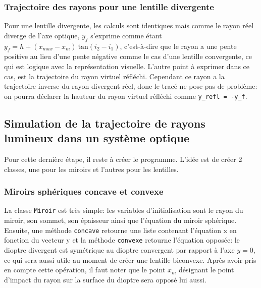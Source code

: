 \documentclass[a4paper, 11pt]{article}
\begin{document}
\subsubsection{Trajectoire des rayons pour une lentille divergente}
Pour une lentille divergente, les calculs sont identiques mais comme le rayon réel diverge de l'axe optique, $y_f$ s'exprime comme étant $y_f = h + (x_{max} - x_m) \: \text{tan} (i_2 - i_1)$,
c'est-à-dire que le rayon a une pente positive au lieu d'une pente négative comme le cas d'une lentille convergente, ce qui est logique avec la représentation visuelle. L'autre point à exprimer dans ce cas, est la trajectoire du rayon virtuel réfléchi. Cependant ce rayon a la trajectoire inverse du rayon divergent réel, donc le tracé ne pose pas de problème: on pourra déclarer la hauteur du rayon virtuel réfléchi comme \verb|y_refl = -y_f|.

\subsection{Simulation de la trajectoire de rayons lumineux dans un système optique}
Pour cette dernière étape, il reste à créer le programme. L'idée est de créer 2 classes, une pour les miroirs et l'autres pour les lentilles. 

\subsubsection{Miroirs sphériques concave et convexe}
La classe \verb|Miroir| est très simple: les variables d'initialisation sont le rayon du miroir, son sommet, son épaisseur ainsi que l'équation du miroir sphérique. Ensuite, une méthode \verb|concave| retourne une liste contenant l'équation x en fonction du vecteur y et la méthode \verb|convexe| retourne l'équation opposée: le dioptre divergent est symétrique au dioptre convergent par rapport à l'axe $y=0$, ce qui sera aussi utile au moment de créer une lentille biconvexe. Après avoir pris en compte cette opération, il faut noter que le point $x_m$ désignant le point d'impact du rayon sur la surface du dioptre sera opposé lui aussi.
\end{document}
